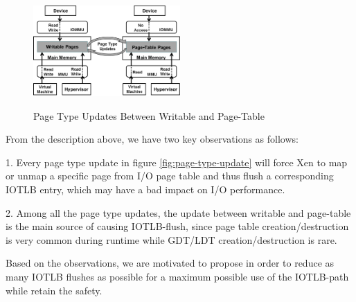 \begin{figure}[ht]
\centering
\includegraphics[width=0.5\textwidth]{image/background/wr2pt.png} \\
\caption{Page Type Updates Between Writable and Page-Table}
\label{fig:wr2pt}
\end{figure}

From the description above, we have two key observations as follows:

1. Every page type update in figure \ref{fig:page-type-update} will force Xen to map or unmap a specific page from I/O page table and thus flush a corresponding IOTLB entry, which may have a bad impact on I/O performance.

2. Among all the page type updates, the update between writable and page-table is the main source of causing IOTLB-flush, since page table creation/destruction is very common during runtime while GDT/LDT creation/destruction is rare.

Based on the observations, we are motivated to propose \name in order to reduce as many IOTLB flushes as possible for a maximum possible use of the IOTLB-path while retain the safety.
